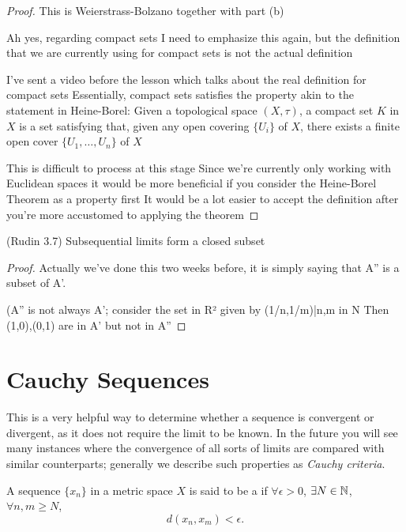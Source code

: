 \begin{proof}
This is Weierstrass-Bolzano together with part (b)

Ah yes, regarding compact sets
I need to emphasize this again, but the definition that we are currently using for compact sets is not the actual definition

I've sent a video before the lesson which talks about the real definition for compact sets %
Essentially, compact sets satisfies the property akin to the statement in Heine-Borel:
Given a topological space $(X,\tau)$, a compact set $K$ in $X$ is a set satisfying that, given any open covering $\{U_i\}$ of $X$, there exists a finite open cover $\{U_1,\dots,U_n\}$ of $X$

This is difficult to process at this stage
Since we're currently only working with Euclidean spaces it would be more beneficial if you consider the Heine-Borel Theorem as a property first
It would be a lot easier to accept the definition after you're more accustomed to applying the theorem
\end{proof}

\begin{proposition}
(Rudin 3.7) Subsequential limits form a closed subset
\end{proposition}

\begin{proof}
Actually we've done this two weeks before, it is simply saying that A'' is a subset of A'.

(A'' is not always A'; consider the set in R² given by
{(1/n,1/m)|n,m in N}
Then (1,0),(0,1) are in A' but not in A''
\end{proof}
\pagebreak

\section{Cauchy Sequences}
This is a very helpful way to determine whether a sequence is convergent or divergent, as it does not require the limit to be known. In the future you will see many instances where the convergence of all sorts of limits are compared with similar counterparts; generally we describe such properties as \emph{Cauchy criteria}.

\begin{definition}
A sequence $\{x_n\}$ in a metric space $X$ is said to be a  if $\forall\epsilon>0$, $\exists N\in\mathbb N$, $\forall n,m\ge N$,
\[ d(x_n,x_m)<\epsilon. \] 
\end{definition}

